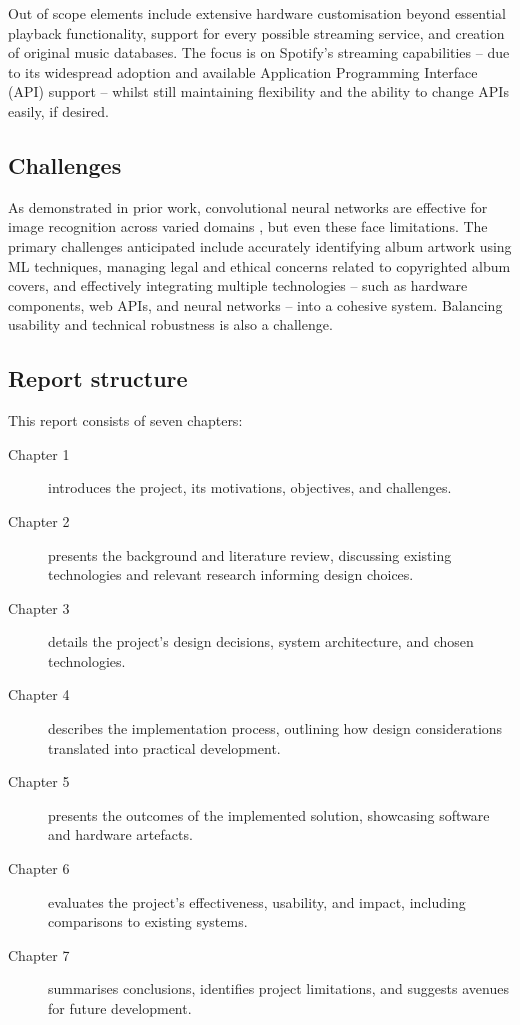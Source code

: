             Out of scope elements include extensive hardware customisation beyond essential playback functionality, support for every possible streaming service, and creation of original music databases. The focus is on Spotify's streaming capabilities -- due to its widespread adoption and available Application Programming Interface (API) support -- whilst still maintaining flexibility and the ability to change APIs easily, if desired.
        
        \subsection{Challenges}
    
            As demonstrated in prior work, convolutional neural networks are effective for image recognition across varied domains \cite{cnnsforimagerecognition, imagenetclasscnn}, but even these face limitations. The primary challenges anticipated include accurately identifying album artwork using ML techniques, managing legal and ethical concerns related to copyrighted album covers, and effectively integrating multiple technologies -- such as hardware components, web APIs, and neural networks -- into a cohesive system. Balancing usability and technical robustness is also a challenge.
        
        \subsection{Report structure} %
        
            This report consists of seven chapters:
            \begin{description}
                \item[Chapter 1] introduces the project, its motivations, objectives, and challenges.
                \item[Chapter 2] presents the background and literature review, discussing existing technologies and relevant research informing design choices.
                \item[Chapter 3] details the project's design decisions, system architecture, and chosen technologies.
                \item[Chapter 4] describes the implementation process, outlining how design considerations translated into practical development.
                \item[Chapter 5] presents the outcomes of the implemented solution, showcasing software and hardware artefacts.
                \item[Chapter 6] evaluates the project's effectiveness, usability, and impact, including comparisons to existing systems.
                \item[Chapter 7] summarises conclusions, identifies project limitations, and suggests avenues for future development.
            \end{description}
    
